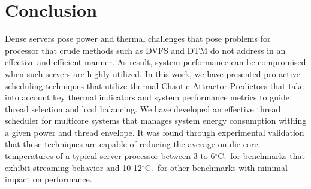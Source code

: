 \documentclass[times, 10pt,twocolumn]{IEEEtran}
\begin{document}
\section{Conclusion}
\label{sec:conclusion}
Dense servers pose power and thermal challenges that pose problems for
processor that crude methods such as DVFS and DTM do not address in an
effective and efficient manner.   As result, system performance can be
compromised when such servers are highly utilized.   In this work, we
have presented pro-active scheduling techniques that utilize thermal
Chaotic Attractor Predictors that take into account key thermal
indicators and system performance metrics to guide thread selection  and
load balancing.  We have developed an effective thread scheduler for
multicore systems that manages system energy consumption withing a given
power and thread envelope. It was found through experimental validation
that these techniques are capable of reducing the average on-die core
temperatures of a typical server processor between 3 to 6$^{\circ}$C.\ for
benchmarks that exhibit streaming behavior and 10-12$^{\circ}$C.\ for
other benchmarks with minimal impact on performance.

\label{sec:references}


\end{document}
